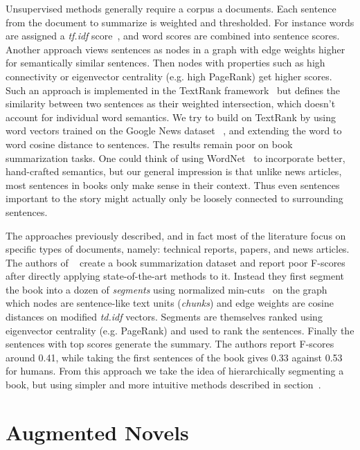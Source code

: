 \documentclass[twoside]{article}
\makeatletter
\let\ref\@refstar
\makeatother
\begin{document}
\begin{multicols}{2}
Unsupervised methods generally require a corpus a documents. Each sentence from the document to summarize is weighted and thresholded. For instance words are assigned a \textsl{tf.idf} score~\cite{salton1988term}, and word scores are combined into sentence scores. Another approach views sentences as nodes in a graph with edge weights higher for semantically similar sentences. Then nodes with properties such as high connectivity or eigenvector centrality (e.g. high PageRank) get higher scores. Such an approach is implemented in the TextRank framework~\cite{mihalcea2004textrank} but defines the similarity between two sentences as their weighted intersection, which doesn't account for individual word semantics. We try to build on TextRank by using word vectors trained on the Google News dataset ~\cite{mikolov2013distributed}, and extending the word to word cosine distance to sentences. The results remain poor on book summarization tasks. One could think of using WordNet~\cite{miller1995wordnet} to incorporate better, hand-crafted semantics, but our general impression is that unlike news articles, most sentences in books only make sense in their context. Thus even sentences important to the story might actually only be loosely connected to surrounding sentences.

The approaches previously described, and in fact most of the literature focus on specific types of documents, namely: technical reports, papers, and news articles. The authors of ~\cite{mihalcea2007explorations} create a book summarization dataset and report poor F-scores after directly applying state-of-the-art methods to it. Instead they first segment the book into a dozen of \emph{segments} using normalized min-cuts~\cite{leighton1999multicommodity} on the graph which nodes are sentence-like text units (\emph{chunks}) and edge weights are cosine distances on modified \textsl{td.idf} vectors. Segments are themselves ranked using eigenvector centrality (e.g. PageRank) and used to rank the sentences. Finally the sentences with top scores generate the summary. The authors report F-scores around 0.41, while taking the first sentences of the book gives 0.33 against 0.53 for humans. From this approach we take the idea of hierarchically segmenting a book, but using simpler and more intuitive methods described in section~\ref{section:augmented}.


\section{Augmented Novels \label{section:augmented}}


\end{multicols}
\end{document}
